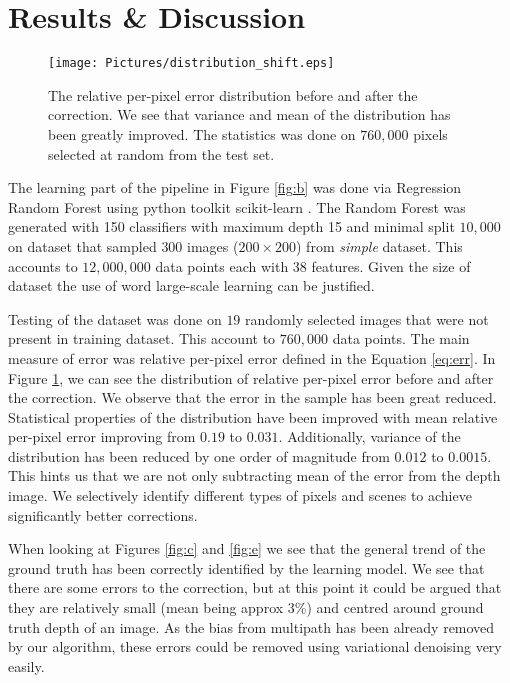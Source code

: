\documentclass[11pt,twocolumn]{article}
\begin{document}
\section{Results \& Discussion}
\begin{figure}
    \centering
    \texttt{[image: Pictures/distribution\_shift.eps]}
    \caption{The relative per-pixel error distribution before and after the correction. We see that variance and mean of the distribution has been greatly improved. The statistics was done on $760,000$ pixels selected at random from the test set.}
    \label{fig:d}
\end{figure}
The learning part of the pipeline in Figure \ref{fig:b} was done via Regression Random Forest using python toolkit scikit-learn \cite{scikit-learn}. The Random Forest was generated with 150 classifiers with maximum depth 15 and minimal split $10,000$ on dataset that sampled $300$ images ($200 \times 200$) from \emph{simple} dataset. This accounts to $12, 000 ,000$ data points each with $38$ features. Given the size of dataset the use of word large-scale learning can be justified.

Testing of the dataset was done on $19$ randomly selected images that were not present in training dataset. This account to $ 760,000$ data points. The main measure of error was relative per-pixel error defined in the Equation \eqref{eq:err}. In Figure \ref{fig:d}, we can see the distribution of relative per-pixel error before and after the correction. We observe that the error in the sample has been great reduced. Statistical properties of the distribution have been improved with mean relative per-pixel error improving from $0.19$ to $0.031$. Additionally, variance of the distribution has been reduced by one order of magnitude from $0.012$ to $0.0015$. This hints us that we are not only subtracting mean of the error from the depth image. We selectively identify different types of pixels and scenes to achieve significantly better corrections. 

When looking at Figures \ref{fig:c} and \ref{fig:e} we see that the general trend of the ground truth has been correctly identified by the learning model. We see that there are some errors to the correction, but at this point it could be argued that they are relatively small (mean being approx 3\%) and centred around ground truth depth of an image. As the bias from multipath has been already removed by our algorithm, these errors could be removed using variational denoising very easily.
\end{document}

